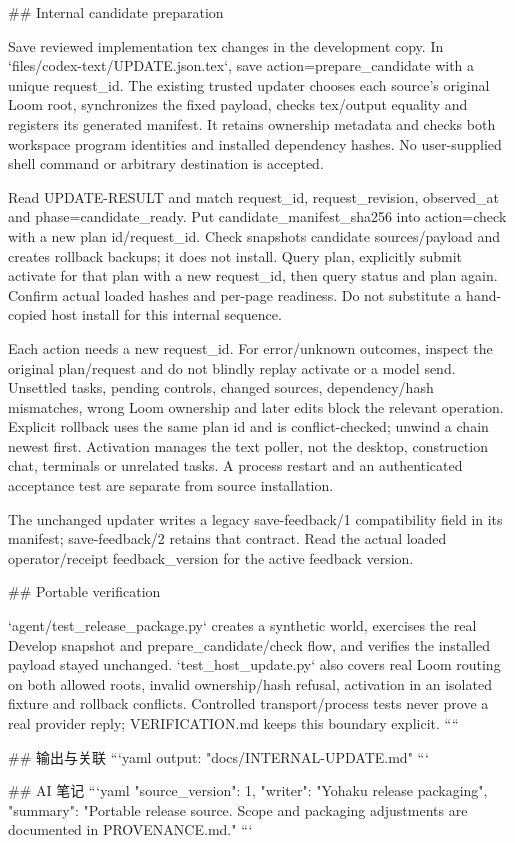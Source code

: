 ## Internal candidate preparation

Save reviewed implementation tex changes in the development copy. In
`files/codex-text/UPDATE.json.tex`, save action=prepare_candidate with a unique
request_id. The existing trusted updater chooses each source's original Loom
root, synchronizes the fixed payload, checks tex/output equality and registers
its generated manifest. It retains ownership metadata and checks both workspace
program identities and installed dependency hashes. No user-supplied shell
command or arbitrary destination is accepted.

Read UPDATE-RESULT and match request_id, request_revision, observed_at and
phase=candidate_ready. Put candidate_manifest_sha256 into action=check with a
new plan id/request_id. Check snapshots candidate sources/payload and creates
rollback backups; it does not install. Query plan, explicitly submit activate
for that plan with a new request_id, then query status and plan again. Confirm
actual loaded hashes and per-page readiness. Do not substitute a hand-copied
host install for this internal sequence.

Each action needs a new request_id. For error/unknown outcomes, inspect the
original plan/request and do not blindly replay activate or a model send.
Unsettled tasks, pending controls, changed sources, dependency/hash mismatches,
wrong Loom ownership and later edits block the relevant operation. Explicit
rollback uses the same plan id and is conflict-checked; unwind a chain newest
first. Activation manages the text poller, not the desktop, construction chat,
terminals or unrelated tasks. A process restart and an authenticated acceptance
test are separate from source installation.

The unchanged updater writes a legacy save-feedback/1 compatibility field in
its manifest; save-feedback/2 retains that contract. Read the actual loaded
operator/receipt feedback_version for the active feedback version.

## Portable verification

`agent/test_release_package.py` creates a synthetic world, exercises the real
Develop snapshot and prepare_candidate/check flow, and verifies the installed
payload stayed unchanged. `test_host_update.py` also covers real Loom routing
on both allowed roots, invalid ownership/hash refusal, activation in an isolated
fixture and rollback conflicts. Controlled transport/process tests never prove
a real provider reply; VERIFICATION.md keeps this boundary explicit.
````

## 输出与关联
```yaml
output: "docs/INTERNAL-UPDATE.md"
```

## AI 笔记
```yaml
{"source_version": 1, "writer": "Yohaku release packaging", "summary": "Portable release source. Scope and packaging adjustments are documented in PROVENANCE.md."}
```
